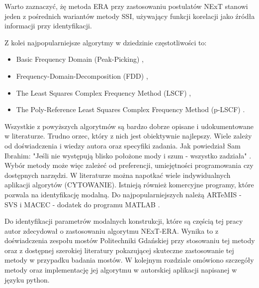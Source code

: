 Warto zaznaczyć, żę metoda ERA przy zastosowaniu postulatów NExT stanowi jeden z pośrednich wariantów metody SSI, używający funkcji korelacji jako źródła informacji przy identyfikacji.

Z kolei najpopularniejsze algorytmy w dziedzinie częstotliwości to:
\begin{itemize}[noitemsep]
\item Basic Frequency Domain (Peak-Picking) \parencite{Felber1994},
\item Frequency-Domain-Decomposition (FDD) \parencite{Brincker2000,Brincker2001a,Brincker2001b},
\item The Least Squares Complex Frequency Method (LSCF) \parencite{Verboven2005},
\item The Poly-Reference Least Squares Complex Frequency Method (p-LSCF) \parencite{Peeters2005}.
\end{itemize}



Wszystkie z powyższych algorytmów są bardzo dobrze opisane i udokumentowane w literaturze. Trudno orzec, który z nich jest obiektywnie najlepszy. Wiele zależy od doświadczenia i wiedzy autora oraz specyfiki zadania. Jak powiedział Sam Ibrahim: "Jeśli nie występują blisko położone mody i szum - wszystko zadziała" . Wybór metody może więc zależeć od preferencji, umiejętności programowania czy dostępnych narzędzi. W literaturze można napotkać wiele indywidualnych aplikacji algorytów (CYTOWANIE). Istnieją również komercyjne programy, które pozwala na identyfikację modalną. Do najpopularniejszych należą ARTeMIS - SVS \parencite{Extractor1999} i MACEC - dodatek do programu MATLAB \parencite{Reynders2014}.

Do identyfikacji parametrów modalnych konstrukcji, które są częścią tej pracy autor zdecydował o zastosowaniu algorytmu NExT-ERA. Wynika to z doświadczenia zespołu mostów Politechniki Gdańskiej przy stosowaniu tej metody oraz z dostępnej szerokiej literatury pokazującej skuteczne zastosowanie tej metody w przypadku badania mostów. W kolejnym rozdziale omówiono szczegóły metody oraz implementację jej algorytmu w autorskiej aplikacji napisanej w języku python.

